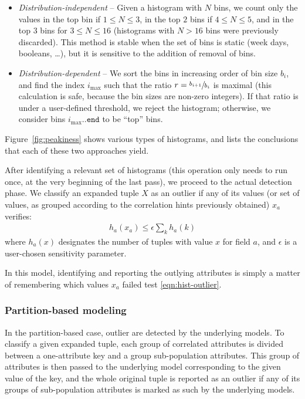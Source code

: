\begin{itemize}
\item \emph{Distribution-independent} -- Given a histogram with $N$ bins, we count only the values in the top bin if $1 \leq N \leq 3$, in the top $2$ bins if $4 \leq N \leq 5$, and in the top $3$ bins for $3 \leq N \leq 16$ (histograms with $N > 16$ bins were previously discarded). This method is stable when the set of bins is static (week days, booleans, \ldots), but it is sensitive to the addition of removal of bins.
\item \emph{Distribution-dependent} -- We sort the bins in increasing order of bin size $b_i$, and find the index $i_{\max}$ such that the ratio $r = \sfrac{b_{i+1}}{b_{i}}$ is maximal (this calculation is safe, because the bin sizes are non-zero integers). If that ratio is under a user-defined threshold, we reject the histogram; otherwise, we consider bins $i_{\max} .. \texttt{end}$ to be ``top'' bins.
\end{itemize}

Figure~\ref{fig:peakiness} shows various types of histograms, and lists the conclusions that each of these two approaches yield.

After identifying a relevant set of histograms (this operation only needs to run once, at the very beginning of the last pass), we proceed to the actual detection phase. We classify an expanded tuple $X$ as an outlier if any of its values (or set of values, as grouped according to the correlation hints previously obtained) $x_a$ verifies:
\begin{align}
h_a(x_a) \le \epsilon \sum_k h_a(k)
\label{eqn:hist-outlier}
\end{align}
where $h_a(x)$ designates the number of tuples with value $x$ for field $a$, and $\epsilon$ is a user-chosen sensitivity parameter.

In this model, identifying and reporting the outlying attributes is simply a matter of remembering which values $x_a$ failed test \eqref{eqn:hist-outlier}.

\subsubsection{Partition-based modeling}
In the partition-based case, outlier are detected by the underlying models. To classify a given expanded tuple, each group of correlated attributes is divided between a one-attribute key and a group sub-population attributes. This group of attributes is then passed to the underlying model corresponding to the given value of the key, and the whole original tuple is reported as an outlier if any of its groups of sub-population attributes is marked as such by the underlying models.
